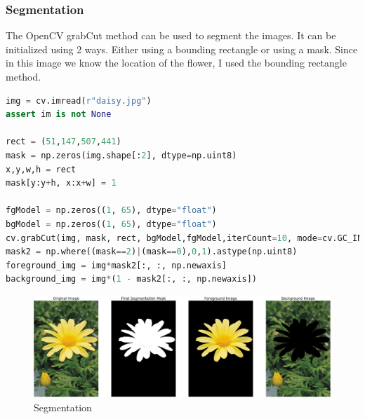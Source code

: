 \documentclass[a4paper]{article}
\begin{document}
\subsubsection*{Segmentation}
The OpenCV grabCut method can be used to segment
 the images. It can be initialized using 2 ways.
  Either using a bounding rectangle or using a mask.
   Since in this image we know the location of the flower,
    I used the bounding rectangle method. 
\begin{lstlisting}[language=python]
img = cv.imread(r"daisy.jpg")
assert im is not None

rect = (51,147,507,441)
mask = np.zeros(img.shape[:2], dtype=np.uint8)
x,y,w,h = rect
mask[y:y+h, x:x+w] = 1 

fgModel = np.zeros((1, 65), dtype="float")
bgModel = np.zeros((1, 65), dtype="float")
cv.grabCut(img, mask, rect, bgModel,fgModel,iterCount=10, mode=cv.GC_INIT_WITH_RECT)
mask2 = np.where((mask==2)|(mask==0),0,1).astype(np.uint8)
foreground_img = img*mask2[:, :, np.newaxis] 
background_img = img*(1 - mask2[:, :, np.newaxis])
\end{lstlisting}
\begin{figure}[!htb]
    \centering
    \includegraphics[width=\textwidth]{../q71.png}
    \caption{Segmentation}
    \label{figq71}
\end{figure}
\end{document}
